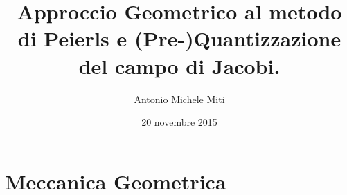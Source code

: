 \documentclass[8pt,handout]{beamer}
\title{ Approccio Geometrico al metodo di Peierls e (Pre-)Quantizzazione del campo di Jacobi.}
\author{Antonio Michele Miti}
\date{20 novembre 2015}
\begin{document}

\ifToninus
\else
	\frame{\titlepage}
\fi

\ifToninus
%	
\else
\fi


	

	\section{Meccanica Geometrica}
\ifToninus
%
\else
\fi
		
\end{document}
